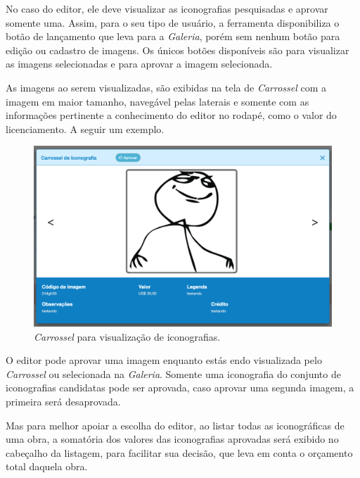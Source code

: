 \documentclass[
  12pt,            %
  openany,
  oneside,
  a4paper,         %
  english,      %
  brazil
]{article}
\numberwithin{figure}{section}
\numberwithin{table}{section}
\begin{document}
No caso do editor, ele deve visualizar as iconografias pesquisadas e aprovar somente uma. Assim, para o seu tipo de usuário, a ferramenta disponibiliza o botão de lançamento que leva para a \textit{Galeria}, porém sem nenhum botão para edição ou cadastro de imagens. Os únicos botões disponíveis são para visualizar as imagens selecionadas e para aprovar a imagem selecionada.

As imagens ao serem visualizadas, são exibidas na tela de \textit{Carrossel} com a imagem em maior tamanho, navegável pelas laterais e somente com as informações pertinente a conhecimento do editor no rodapé, como o valor do licenciamento. A seguir um exemplo.

\begin{figure}[H]
  \centering
  \includegraphics[width=0.9\linewidth]{iconr_carrossel}
  \caption{\textit{Carrossel} para visualização de iconografias.}
  \label{fig:iconr:carrossel}
\end{figure}

O editor pode aprovar uma imagem enquanto estás endo visualizada pelo \textit{Carrossel} ou selecionada na \textit{Galeria}. Somente uma iconografia do conjunto de iconografias candidatas pode ser aprovada, caso aprovar uma segunda imagem, a primeira será desaprovada.

Mas para melhor apoiar a escolha do editor, ao listar todas as iconográficas de uma obra, a somatória dos valores das iconografias aprovadas será exibido no cabeçalho da listagem, para facilitar sua decisão, que leva em conta o orçamento total daquela obra.
\end{document}

